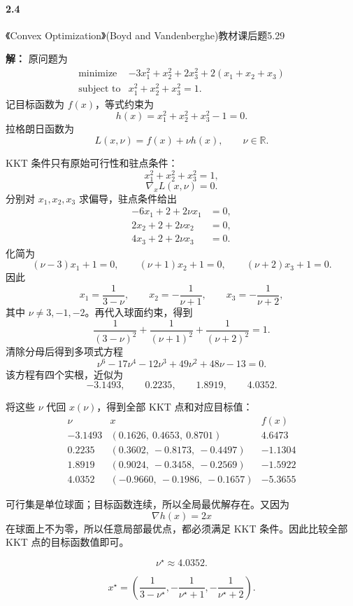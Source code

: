 \documentclass[12pt,a4paper]{article}
\begin{document}
\paragraph{2.4} 《Convex Optimization》(Boyd and Vandenberghe)教材课后题5.29

\textbf{解：}
原问题为
\[
\begin{array}{ll}
  \text{minimize} &
  -3x_1^2+x_2^2+2x_3^2+2(x_1+x_2+x_3)\\
  \text{subject to} &
  x_1^2+x_2^2+x_3^2=1.
\end{array}
\]
记目标函数为 $f(x)$，等式约束为
\[
  h(x)=x_1^2+x_2^2+x_3^2-1=0.
\]
拉格朗日函数为
\[
  L(x,\nu)=f(x)+\nu h(x),
  \qquad \nu\in\mathbb R.
\]

KKT 条件只有原始可行性和驻点条件：
\[
  x_1^2+x_2^2+x_3^2=1,
\]
\[
  \nabla_xL(x,\nu)=0.
\]
分别对 $x_1,x_2,x_3$ 求偏导，驻点条件给出
\[
\begin{aligned}
  -6x_1+2+2\nu x_1&=0,\\
  2x_2+2+2\nu x_2&=0,\\
  4x_3+2+2\nu x_3&=0.
\end{aligned}
\]
化简为
\[
  (\nu-3)x_1+1=0,\qquad
  (\nu+1)x_2+1=0,\qquad
  (\nu+2)x_3+1=0.
\]
因此
\[
  x_1=\frac{1}{3-\nu},\qquad
  x_2=-\frac{1}{\nu+1},\qquad
  x_3=-\frac{1}{\nu+2},
\]
其中 $\nu\neq3,-1,-2$。再代入球面约束，得到
\[
  \frac{1}{(3-\nu)^2}
  +\frac{1}{(\nu+1)^2}
  +\frac{1}{(\nu+2)^2}
  =1.
\]
清除分母后得到多项式方程
\[
  \nu^6-17\nu^4-12\nu^3+49\nu^2+48\nu-13=0.
\]
该方程有四个实根，近似为
\[
  -3.1493,\qquad 0.2235,\qquad 1.8919,\qquad 4.0352.
\]

将这些 $\nu$ 代回 $x(\nu)$，得到全部 KKT 点和对应目标值：
\[
\begin{array}{c|c|c}
  \nu & x & f(x)\\ \hline
  -3.1493 & (0.1626,\ 0.4653,\ 0.8701) & 4.6473\\
  0.2235 & (0.3602,\ -0.8173,\ -0.4497) & -1.1304\\
  1.8919 & (0.9024,\ -0.3458,\ -0.2569) & -1.5922\\
  4.0352 & (-0.9660,\ -0.1986,\ -0.1657) & -5.3655
\end{array}
\]

可行集是单位球面；目标函数连续，所以全局最优解存在。又因为
\[
  \nabla h(x)=2x
\]
在球面上不为零，所以任意局部最优点，都必须满足 KKT 条件。因此比较全部 KKT 点的目标函数值即可。

\[
  \nu^\star\approx4.0352.
\]

\[
  \boxed{
  x^\star=
  \left(
    \frac{1}{3-\nu^\star},
    -\frac{1}{\nu^\star+1},
    -\frac{1}{\nu^\star+2}
  \right).}
\]
\end{document}
